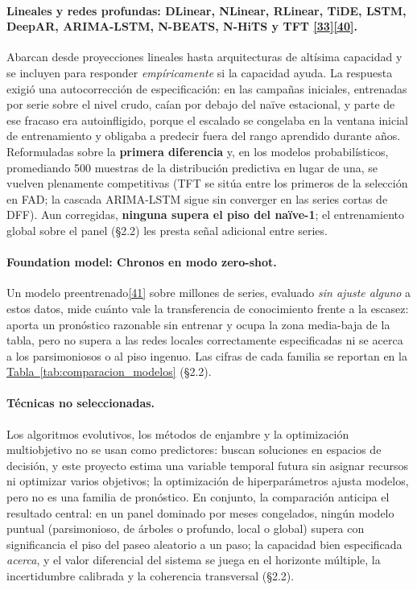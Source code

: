 \documentclass[12pt,letterpaper]{report}
\newcommand{\cita}[1]{\hyperref[bib:#1]{[#1]}}
\begin{document}
\paragraph{Lineales y redes profundas: DLinear, NLinear, RLinear, TiDE, LSTM, DeepAR, ARIMA-LSTM,
N-BEATS, N-HiTS y TFT \cita{33}\textendash\cita{40}.} Abarcan desde proyecciones lineales hasta
arquitecturas de altísima capacidad y se incluyen para responder \textit{empíricamente} si la
capacidad ayuda. La respuesta exigió una autocorrección de especificación: en las campañas
iniciales, entrenadas por serie sobre el nivel crudo, caían por debajo del naïve estacional, y
parte de ese fracaso era autoinfligido, porque el escalado se congelaba en la ventana inicial
de entrenamiento y obligaba a predecir fuera del rango aprendido durante años. Reformuladas
sobre la \textbf{primera diferencia} y, en los modelos probabilísticos, promediando 500
muestras de la distribución predictiva en lugar de una, se vuelven plenamente competitivas (TFT
se sitúa entre los primeros de la selección en FAD; la cascada ARIMA-LSTM sigue sin converger
en las series cortas de DFF). Aun corregidas, \textbf{ninguna supera el piso del naïve-1}; el
entrenamiento global sobre el panel (§2.2) les presta señal adicional entre series.

\paragraph{Foundation model: Chronos en modo zero-shot.} Un modelo preentrenado\cita{41} sobre
millones de series, evaluado \textit{sin ajuste alguno} a estos datos, mide cuánto vale la
transferencia de conocimiento frente a la escasez: aporta un pronóstico razonable sin entrenar
y ocupa la zona media-baja de la tabla, pero no supera a las redes locales correctamente
especificadas ni se acerca a los parsimoniosos o al piso ingenuo. Las cifras de cada familia se
reportan en la \hyperref[tab:comparacion_modelos]{Tabla~\ref*{tab:comparacion_modelos}} (§2.2).

\paragraph{Técnicas no seleccionadas.} Los algoritmos evolutivos, los métodos de enjambre y
la optimización multiobjetivo no se usan como predictores: buscan soluciones en espacios de
decisión, y este proyecto estima una variable temporal futura sin asignar recursos ni optimizar
varios objetivos; la optimización de hiperparámetros ajusta modelos, pero no es una familia de
pronóstico. En conjunto, la comparación anticipa el resultado central: en un panel dominado por
meses congelados, ningún modelo puntual (parsimonioso, de árboles o profundo, local o global)
supera con significancia el piso del paseo aleatorio a un paso; la capacidad bien especificada
\textit{acerca}, y el valor diferencial del sistema se juega en el horizonte múltiple, la
incertidumbre calibrada y la coherencia transversal (§2.2).
\end{document}
